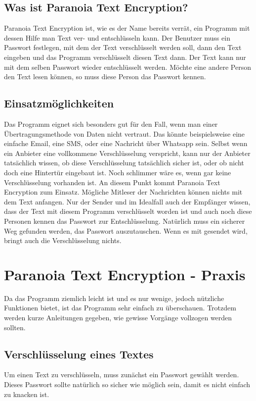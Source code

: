 \documentclass[12pt,a4paper]{scrreprt}
\begin{document}
\section{Was ist Paranoia Text Encryption?}
Paranoia Text Encryption ist, wie es der Name bereits verrät, ein Programm mit dessen Hilfe man Text ver- und entschlüsseln kann. Der Benutzer muss ein Passwort festlegen, mit dem der Text verschlüsselt werden soll, dann den Text eingeben und das Programm verschlüsselt diesen Text dann. Der Text kann nur mit dem selben Passwort wieder entschlüsselt werden. Möchte eine andere Person den Text lesen können, so muss diese Person das Passwort kennen.

\section{Einsatzmöglichkeiten}
Das Programm eignet sich besonders gut für den Fall, wenn man einer Übertragungsmethode von Daten nicht vertraut. Das könnte beispielsweise eine einfache Email, eine SMS, oder eine Nachricht über Whatsapp sein. Selbst wenn ein Anbieter eine vollkommene Verschlüsselung verspricht, kann nur der Anbieter tatsächlich wissen, ob diese Verschlüsselung tatsächlich sicher ist, oder ob nicht doch eine Hintertür eingebaut ist. Noch schlimmer wäre es, wenn gar keine Verschlüsselung vorhanden ist. An diesem Punkt kommt Paranoia Text Encryption zum Einsatz. Mögliche Mitleser der Nachrichten können nichts mit dem Text anfangen. Nur der Sender und im Idealfall auch der Empfänger wissen, dass der Text mit diesem Programm verschlüsselt worden ist und auch noch diese Personen kennen das Passwort zur Entschlüsselung. Natürlich muss ein sicherer Weg gefunden werden, das Passwort auszutauschen. Wenn es mit gesendet wird, bringt auch die Verschlüsselung nichts.

\chapter{Paranoia Text Encryption - Praxis}
Da das Programm ziemlich leicht ist und es nur wenige, jedoch nützliche Funktionen bietet, ist das Programm sehr einfach zu überschauen. Trotzdem werden kurze Anleitungen gegeben, wie gewisse Vorgänge vollzogen werden sollten.

\section{Verschlüsselung eines Textes}
Um einen Text zu verschlüsseln, muss zunächst ein Passwort gewählt werden. Dieses Passwort sollte natürlich so sicher wie möglich sein, damit es nicht einfach zu knacken ist.
\end{document}
